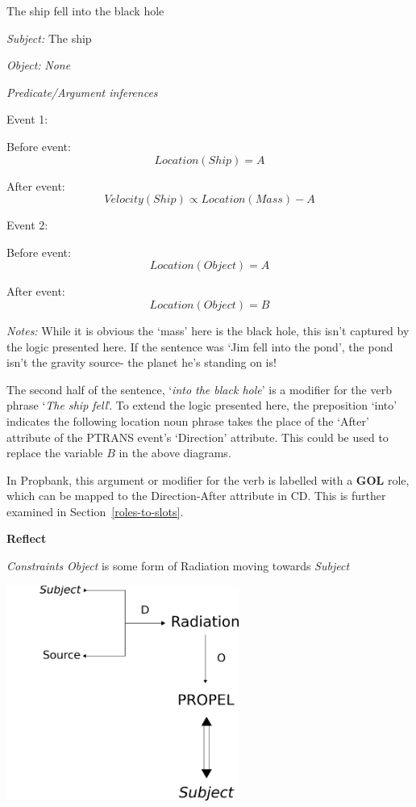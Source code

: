 \documentclass[../dissertation]{subfiles}
\begin{document}
The ship fell into the black hole

\textit{Subject:} The ship

\textit{Object:} \textit{None}
\smallskip

\textit{Predicate/Argument inferences}

Event 1:

Before event:
\[Location(Ship) = A\]

After event:
\[Velocity(Ship) \propto Location(Mass) - A\]

Event 2:

Before event:
\[Location(Object) = A\]

After event:
\[Location(Object) = B\]
\bigskip

\textit{Notes:} While it is obvious the `mass' here is the black hole, this isn't captured by the logic presented here. If the sentence was `Jim fell into the pond', the pond isn't the gravity source- the planet he's standing on is!

The second half of the sentence, `\textit{into the black hole}' is a modifier for the verb phrase `\textit{The ship fell}'. To extend the logic presented here, the preposition `into' indicates the following location noun phrase takes the place of the `After' attribute of the PTRANS event's `Direction' attribute. This could be used to replace the variable \(B\) in the above diagrams.

In Propbank, this argument or modifier for the verb is labelled with a \textbf{GOL} role, which can be mapped to the Direction-After attribute in CD. This is further examined in Section~\ref{roles-to-slots}.
\newpage

\textbf{Reflect}

\textit{Constraints}
\textit{Object} is some form of Radiation moving towards \textit{Subject}
\bigskip

\begin{center}
	\includegraphics[height=200pt]{reflects-cd.png}
\end{center}
\end{document}
